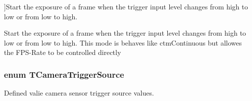 \begin{Desc}
\begin{description}
{}]Start the exposure of a frame when the trigger input level changes from high to low or from low to high. \item[{\em 
\hypertarget{group___device_specific_interface_gga7d880247a3af52241ce96ba703c526a1a4b1d48ace873ad0bebdc7700f97ad1a7}{ctm\+Framerate\+Controlled}\label{group___device_specific_interface_gga7d880247a3af52241ce96ba703c526a1a4b1d48ace873ad0bebdc7700f97ad1a7}
}]Start the exposure of a frame when the trigger input level changes from high to low or from low to high. This mode is behaves like ctm\+Continuous but allowes the F\+P\+S-\/\+Rate to be controlled directly \end{description}
\end{Desc}
\hypertarget{group___device_specific_interface_ga18243d80e95a98e9596ed83ed96cdb54}{
\subsubsection[{T\+Camera\+Trigger\+Source}]{\setlength{\rightskip}{0pt plus 5cm}enum {\bf T\+Camera\+Trigger\+Source}}}\label{group___device_specific_interface_ga18243d80e95a98e9596ed83ed96cdb54}


Defined valie camera sensor trigger source values. 

